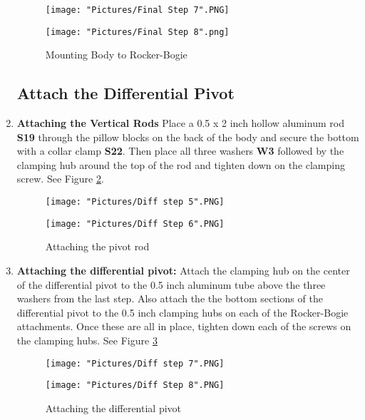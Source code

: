 \documentclass[12pt]{article}
\begin{document}
\begin{enumerate}
\begin{figure}[H]
  \centering
  \begin{minipage}[b]{0.45\textwidth}
    \texttt{[image: "Pictures/Final Step 7".PNG]}
  \end{minipage}
  \hfill
  \begin{minipage}[b]{0.45\textwidth}
    \texttt{[image: "Pictures/Final Step 8".png]}
  \end{minipage}
  \caption{Mounting Body to Rocker-Bogie}
  \label{body to rb}
\end{figure}


\subsection{Attach the Differential Pivot}

\item \textbf{Attaching the Vertical Rods} Place a 0.5 x 2 inch hollow aluminum rod \textbf{S19} through the pillow blocks on the back of the body and secure the bottom with a collar clamp \textbf{S22}. Then place all three washers
\textbf{W3} followed by the clamping hub around the top of the rod and tighten down on the clamping screw. See Figure \ref{attaching pivot rod}.

\begin{figure}[H]
  	\centering
  	\begin{minipage}[b]{0.35\textwidth}
   		\texttt{[image: "Pictures/Diff step 5".PNG]}
  	\end{minipage}
  	\hfill
  	\begin{minipage}[b]{0.35\textwidth}
    		\texttt{[image: "Pictures/Diff Step 6".PNG]}
  	\end{minipage}
  	\caption{Attaching the pivot rod}
  	\label{attaching pivot rod}
\end{figure}

	\item \textbf{Attaching the differential pivot:} Attach the clamping hub on the center of the differential pivot to the 0.5 inch aluminum tube above the three washers from the last step. Also attach the the bottom sections of the differential pivot to the 0.5 inch clamping hubs on each of the Rocker-Bogie attachments. Once these are all in place, tighten down each of the screws on the clamping hubs.  See Figure \ref{attaching diff pvt}

\begin{figure}[H]
  	\centering
  	\begin{minipage}[b]{0.35\textwidth}
   		\texttt{[image: "Pictures/Diff step 7".PNG]}
  	\end{minipage}
  	\hfill
  	\begin{minipage}[b]{0.35\textwidth}
    		\texttt{[image: "Pictures/Diff Step 8".PNG]}
  	\end{minipage}
  	\caption{Attaching the differential pivot}
  	\label{attaching diff pvt}
\end{figure}


\end{enumerate}
\end{document}
